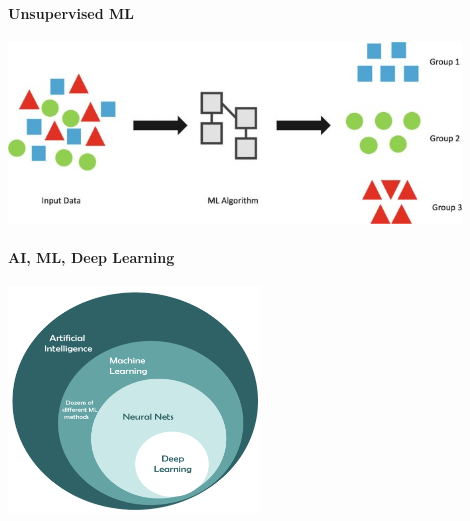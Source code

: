 \documentclass[notes, ignorenonframetext, compress, 10pt, xcolor=svgnames, aspectratio=169]{beamer}
\begin{document}
\begin{frame}[allowframebreaks]{\insertsection}
\framesubtitle{Unsupervised ML}
    \begin{center}
      \includegraphics[width=0.9\textwidth]{../../Ressources/Figs/Fig_UnsuperviseML.jpeg}
      \end{center}
\end{frame}

\begin{frame}[allowframebreaks]{\insertsection}
\framesubtitle{AI,  ML, Deep Learning}
    \begin{center}
     \includegraphics[width=0.5\textwidth]{../../Ressources/Figs/Fig-deep-learning-vs-machine-learning-vs-artificial-intelligence1.png}
    \end{center}
     
\end{frame}
\end{document}
